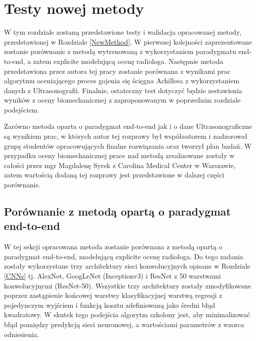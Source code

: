\chapter{Testy nowej metody}

W tym rozdziale zostaną przedstawione testy i walidacja opracowanej metody, przedstawionej w Rozdziale \ref{NewMethod}. W pierwszej kolejności zaprezentowane zostanie porównanie z metodą wytrenowaną z wykorzystaniem paradygmatu end-to-end, a zatem explicite modelującą ocenę radiologa. Następnie metoda przedstawiona przez autora tej pracy zostanie porównana z wynikami prac algorytmu oceniającego proces gojenia się ścięgna Achillesa z wykorzystaniem danych z Ultrasonografii. Finalnie, ostateczny test dotyczyć będzie zestawienia wyników z oceny biomechanicznej z zaproponowanym w poprzednim rozdziale podejściem.

Zarówno metoda oparta o paradygmat end-to-end jak i o dane Ultrasonograficzne są wynikiem prac, w których autor tej rozprawy był współautorem i nadzorował grupę studentów opracowujących finalne rozwiązania oraz tworzył plan badań. W przypadku oceny biomechanicznej prace nad metodą zrealizowane zostały w całości przez mgr Magdalenę Syrek z Carolina Medical Center w Warszawie, zatem wartością dodaną tej rozprawy jest przedstawione w dalszej części porównanie.   

\section{Porównanie z metodą opartą o paradygmat end-to-end}

W tej sekcji opracowana metoda zostanie porównana z metodą opartą o paradygmat end-to-end, modelującą explicite ocenę radiologa. Do tego zadania zostały wykorzystane trzy architektury sieci konwolucyjnych opisane w Rozdziale \ref{CNNs} tj. AlexNet, GoogLeNet (Inceptionv3) i ResNet z 50 warstwami konwolucyjnymi (ResNet-50). Wszystkie trzy architektury zostały zmodyfikowane poprzez zastąpienie końcowej warstwy klasyfikacyjnej warstwą regresji z pojedynczym wyjściem i funkcją kosztu zdefiniowaną jako średni błąd kwadratowy. W skutek tego podejścia algorytm szkolony jest, aby minimalizować błąd pomiędzy predykcją sieci neuronowej, a wartościami parametrów z wzorca odniesienia. 


